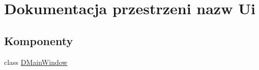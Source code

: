 \hypertarget{namespace_ui}{}\section{Dokumentacja przestrzeni nazw Ui}
\label{namespace_ui}
\subsection*{Komponenty}
\begin{DoxyCompactItemize}
\item 
class \hyperlink{class_ui_1_1_d_main_window}{D\+Main\+Window}
\end{DoxyCompactItemize}
